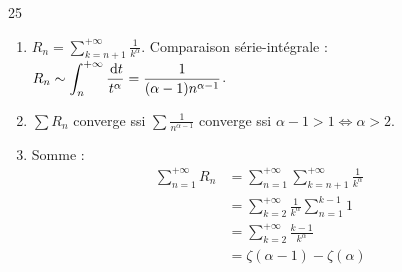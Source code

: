 \begin{correction}{25}
\begin{enumerate}
    \item 
        $\displaystyle R_n = \sum_{k=n+1}^{+\infty} \frac{1}{k^\alpha}$.
        Comparaison série-intégrale : $\displaystyle R_n \sim \int_n^{+\infty} \frac{\,\mathrm{d}t}{t^\alpha} = \frac{1}{(\alpha-1)n^{\alpha-1}}$.
        
    \item $\sum R_n$ converge ssi $\sum \frac{1}{n^{\alpha-1}}$ converge
        ssi $\alpha-1 > 1 \iff \alpha > 2$.

    \item Somme : 
        \begin{align*}
            \sum_{n=1}^{+\infty} R_n &= \sum_{n=1}^{+\infty} \sum_{k=n+1}^{+\infty} \frac{1}{k^\alpha} \\
                &= \sum_{k=2}^{+\infty} \frac{1}{k^\alpha} \sum_{n=1}^{k-1} 1 \\
                &= \sum_{k=2}^{+\infty} \frac{k-1}{k^\alpha} \\
                &= \zeta(\alpha-1) - \zeta(\alpha) &&
        \end{align*}
\end{enumerate}
\end{correction}


